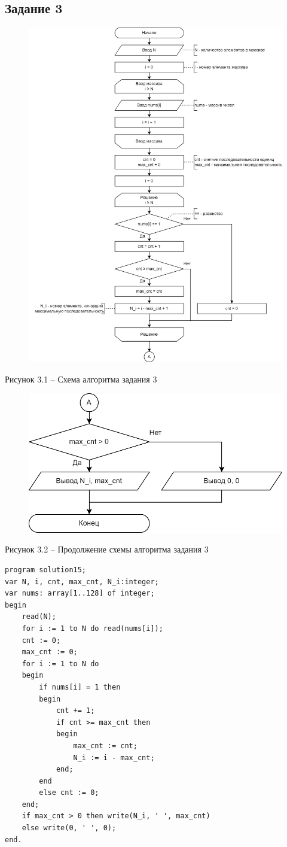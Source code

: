 \documentclass[a4paper,14pt]{extarticle}
\begin{document}
	\newpage
	\subsection*{Задание 3}
	\begin{figure}[h]
		\centering
		\includegraphics[width=0.89\linewidth]{schemes/s-3-1}
	\end{figure}
	\begin{center}
		Рисунок 3.1 – Схема алгоритма задания 3
	\end{center}
	\pagebreak
	\begin{figure}[h]
		\centering
		\includegraphics[width=0.55\linewidth]{schemes/s-3-2}
	\end{figure}
	\begin{center}
		Рисунок 3.2 – Продолжение схемы алгоритма задания 3
	\end{center}
	\begin{lstlisting}[tabsize=2,basicstyle=\ttfamily]
program solution15;
var N, i, cnt, max_cnt, N_i:integer;
var nums: array[1..128] of integer;
begin
	read(N);
	for i := 1 to N do read(nums[i]);
	cnt := 0;
	max_cnt := 0;
	for i := 1 to N do
	begin
		if nums[i] = 1 then
		begin
			cnt += 1;
			if cnt >= max_cnt then
			begin
				max_cnt := cnt;
				N_i := i - max_cnt;
			end;
		end
		else cnt := 0;
	end;
	if max_cnt > 0 then write(N_i, ' ', max_cnt)
	else write(0, ' ', 0);
end.
	\end{lstlisting}
	
\end{document}
